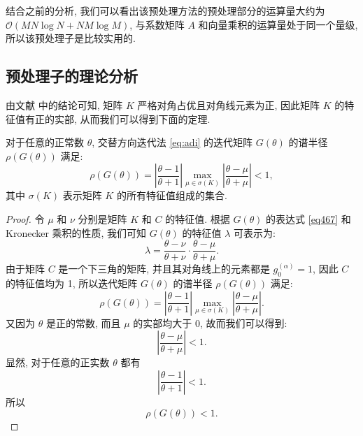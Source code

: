 \documentclass{ecnumaster}
\begin{document}
结合之前的分析,
我们可以看出该预处理方法的预处理部分的运算量大约为
 $\mathcal{O}(MN\log N + NM\log M)$,
与系数矩阵 $A$ 和向量乘积的运算量处于同一个量级,
所以该预处理子是比较实用的.

\subsection{预处理子的理论分析}
由文献 \cite{WWS10} 中的结论可知, 矩阵 $K$ 严格对角占优且对角线元素为正,
因此矩阵 $K$ 的特征值有正的实部, 从而我们可以得到下面的定理.

\begin{theorem}\label{th411}
  对于任意的正常数 $\theta$, 交替方向迭代法 \eqref{eq:adi}
  的迭代矩阵 $G(\theta)$ 的谱半径 $\rho (G(\theta))$ 满足:
  $$
    \rho (G(\theta))
    = \left| \frac{\theta -1}{\theta +1} \right|
    \max _{\mu \in \sigma (K)} \left| \frac{\theta - \mu}{\theta + \mu} \right| < 1,
  $$
  其中 $\sigma (K)$ 表示矩阵 $K$ 的所有特征值组成的集合.
\end{theorem}
\begin{proof}
  令 $\mu$ 和 $\nu$ 分别是矩阵 $K$ 和 $C$ 的特征值.
  根据 $G(\theta)$ 的表达式 \eqref{eq467} 和 Kronecker 乘积的性质, 
  我们可知 $G(\theta)$ 的特征值 $\lambda$ 可表示为:
  $$
    \lambda = \frac{\theta - \nu}{\theta + \nu} \cdot \frac{\theta - \mu}{\theta + \mu}.
  $$
  由于矩阵 $C$ 是一个下三角的矩阵,
  并且其对角线上的元素都是 $g_0^{(\alpha)} = 1$,
  因此 $C$ 的特征值均为 1, 所以迭代矩阵 $G(\theta)$ 的谱半径 $\rho (G(\theta))$ 满足:
  $$
    \rho (G(\theta)) = \left| \frac{\theta -1}{\theta + 1} \right|
    \max_{\mu \in \sigma (K)} \left| \frac{\theta - \mu}{\theta + \mu} \right|.
  $$
  又因为 $\theta$ 是正的常数, 而且 $\mu$ 的实部均大于 $0$, 故而我们可以得到:
  $$
    \left| \frac{\theta - \mu}{\theta + \mu}\right| < 1.
  $$
  显然, 对于任意的正实数 $\theta$ 都有
  $$
    \left| \frac{\theta - 1}{\theta + 1} \right| < 1.
  $$
  所以
  $$
    \rho (G(\theta)) < 1.
  $$
\end{proof}
\end{document}
